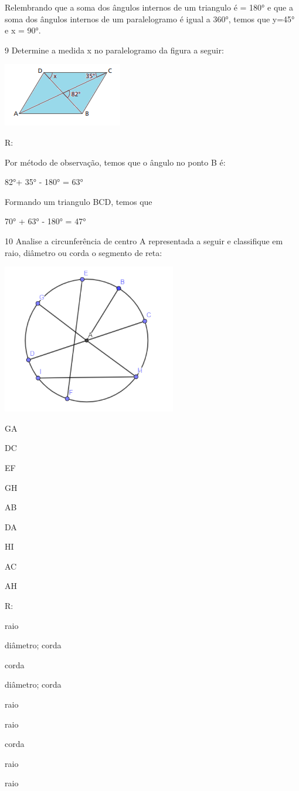 {Relembrando que a soma dos ângulos internos de um triangulo é = 180° e
que a soma dos ângulos internos de um paralelogramo é igual a 360°,
temos que y=45° e x = 90°.

\num{9} Determine a medida x no paralelogramo da figura a seguir:

\includegraphics[width=2.05208in,height=1.09375in]{./imgSAEB_8_MAT/media/image11.png}

R:

Por método de observação, temos que o ângulo no ponto B é:

82°+ 35° - 180° = 63°

Formando um triangulo BCD, temos que

70° + 63° - 180° = 47°

\num{10} Analise a circunferência de centro A representada a seguir e
classifique em raio, diâmetro ou corda o segmento de reta:

\includegraphics[width=2.98681in,height=2.57292in]{./imgSAEB_8_MAT/media/image12.png}
\item GA
\item DC
\item EF
\item GH
\item AB
\item DA
\item HI
\item AC
\item AH

R:
\item raio
\item diâmetro; corda
\item corda
\item diâmetro; corda
\item raio
\item raio
\item corda
\item raio
\item raio

}
